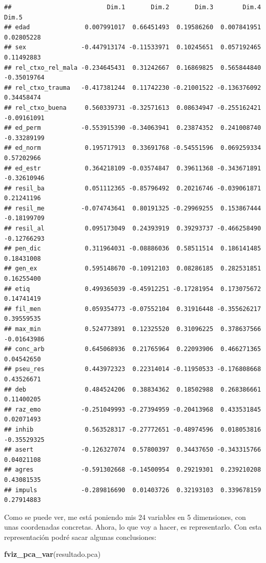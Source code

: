 \documentclass[]{article}
\newenvironment{Shaded}{\begin{snugshade}}{\end{snugshade}}
\newcommand{\KeywordTok}[1]{\textcolor[rgb]{0.13,0.29,0.53}{\textbf{#1}}}
\newcommand{\NormalTok}[1]{#1}
\begin{document}
\begin{verbatim}
##                          Dim.1       Dim.2       Dim.3        Dim.4       Dim.5
## edad               0.007991017  0.66451493  0.19586260  0.007841951  0.02805228
## sex               -0.447913174 -0.11533971  0.10245651  0.057192465  0.11492883
## rel_ctxo_rel_mala -0.234645431  0.31242667  0.16869825  0.565844840 -0.35019764
## rel_ctxo_trauma   -0.417381244  0.11742230 -0.21001522 -0.136376092  0.34458474
## rel_ctxo_buena     0.560339731 -0.32571613  0.08634947 -0.255162421 -0.09161091
## ed_perm           -0.553915390 -0.34063941  0.23874352  0.241008740 -0.33289199
## ed_norm            0.195717913  0.33691768 -0.54551596  0.069259334  0.57202966
## ed_estr            0.364218109 -0.03574847  0.39611368 -0.343671891 -0.32610946
## resil_ba           0.051112365 -0.85796492  0.20216746 -0.039061871  0.21241196
## resil_me          -0.074743641  0.80191325 -0.29969255  0.153867444 -0.18199709
## resil_al           0.095173049  0.24393919  0.39293737 -0.466258490 -0.12766293
## pen_dic            0.311964031 -0.08886036  0.58511514  0.186141485  0.18431008
## gen_ex             0.595148670 -0.10912103  0.08286185  0.282531851  0.16255400
## etiq               0.499365039 -0.45912251 -0.17281954  0.173075672  0.14741419
## fil_men            0.059354773 -0.07552104  0.31916448 -0.355626217  0.39559535
## max_min            0.524773891  0.12325520  0.31096225  0.378637566 -0.01643986
## conc_arb           0.645068936  0.21765964  0.22093906  0.466271365  0.04542650
## pseu_res           0.443972323  0.22314014 -0.11950533 -0.176808668  0.43526671
## deb                0.484524206  0.38834362  0.18502988  0.268386661  0.11400205
## raz_emo           -0.251049993 -0.27394959 -0.20413968  0.433531845  0.02071493
## inhib              0.563528317 -0.27772651 -0.48974596  0.018053816 -0.35529325
## asert             -0.126327074  0.57800397  0.34437650 -0.343315766  0.04021108
## agres             -0.591302668 -0.14500954  0.29219301  0.239210208  0.43081535
## impuls            -0.289816690  0.01403726  0.32193103  0.339678159  0.27914883
\end{verbatim}

Como se puede ver, me está poniendo mis 24 variables en 5 dimensiones,
con unas coordenadas concretas. Ahora, lo que voy a hacer, es
representarlo. Con esta representación podré sacar algunas conclusiones:

\begin{Shaded}
\begin{Highlighting}[]
\KeywordTok{fviz_pca_var}\NormalTok{(resultado.pca)}
\end{Highlighting}
\end{Shaded}
\end{document}
